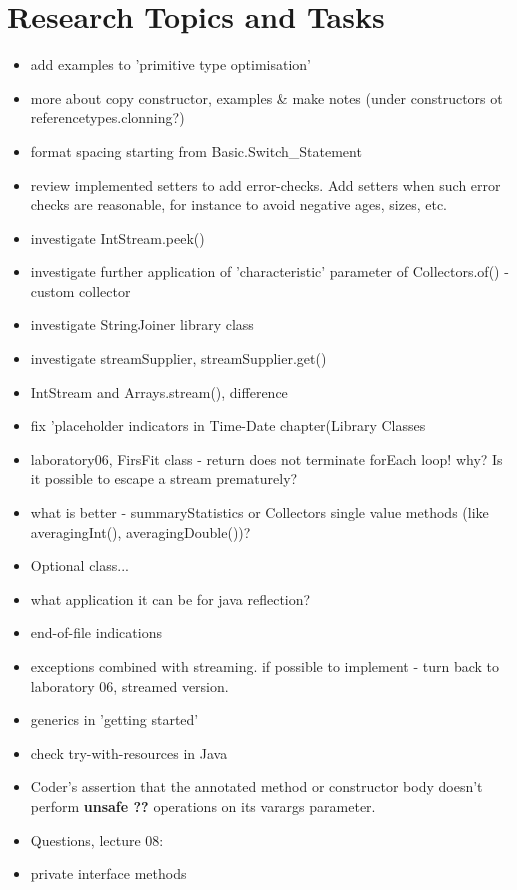 \documentclass{report}
\begin{document}
\section{Research Topics and Tasks}
\begin{itemize}
	\item add examples to 'primitive type optimisation'
	\item more about copy constructor, examples \& make notes (under constructors ot referencetypes.clonning?)
	\item format spacing starting from Basic.Switch\_Statement
	\item review implemented setters to add error-checks. Add setters when such error checks are reasonable,
	for instance to avoid negative ages, sizes, etc.
	\item investigate IntStream.peek()
	\item investigate further application of 'characteristic' parameter of Collectors.of() - 
    custom collector
	\item investigate StringJoiner library class
	\item investigate streamSupplier, streamSupplier.get()
	\item IntStream and Arrays.stream(), difference
	\item fix 'placeholder indicators in Time-Date chapter(Library Classes
	\item laboratory06,  FirsFit class - return does not terminate forEach loop! why? Is it possible to escape a stream prematurely?
	\item what is better - summaryStatistics or Collectors single value methods (like averagingInt(), averagingDouble())?
	\item Optional class...
	\item what application it can be for java reflection?
	\item end-of-file indications
	\item exceptions combined with streaming. if possible to implement - turn back to laboratory 06, streamed version.
	\item generics in 'getting started'
	\item check try-with-resources in Java 
	\item Coder’s assertion that the annotated method or constructor body doesn’t perform \textbf{unsafe ??} operations on its varargs parameter.
	\item Questions, lecture 08:
	\item private interface methods

\end{itemize}
\end{document}

